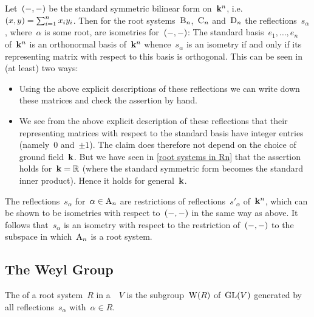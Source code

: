 \begin{remark}
  \label{standard root systems have isometric reflections}
  Let~$(-,-)$ be the standard symmetric bilinear form on~$\mathbf{k}^n$, i.e.~$(x,y) = \sum_{i=1}^n x_i y_i$.
  Then for the root systems~$\mathrm{B}_n$,~$\mathrm{C}_n$ and~$\mathrm{D}_n$ the reflections~$s_\alpha$, where~$\alpha$ is some root, are isometries for~$(-,-)$:
  The standard basis~$e_1, \dotsc, e_n$ of~$\mathbf{k}^n$ is an orthonormal basis of~$\mathbf{k}^n$ whence~$s_\alpha$ is an isometry if and only if its representing matrix with respect to this basis is orthogonal.
  This can be seen in (at least) two ways:
  \begin{itemize}
    \item
      Using the above explicit descriptions of these reflections we can write down these matrices and check the assertion by hand.
    \item
      We see from the above explicit description of these reflections that their representing matrices with respect to the standard basis have integer entries (namely~$0$ and~$\pm 1$).
      The claim does therefore not depend on the choice of ground field~$\kf$.
      But we have seen in \cref{root systems in Rn} that the assertion holds for~$\mathbf{k} = \mathbb{R}$ (where the standard symmetric form becomes the standard inner product).
      Hence it holds for general~$\kf$.
  \end{itemize}
  
  The reflections~$s_\alpha$ for~$\alpha \in \mathrm{A}_n$ are restrictions of reflections~$s'_\alpha$ of~$\mathbf{k}^n$, which can be shown to be isometries with respect to~$(-,-)$ in the same way as above.
  It follows that~$s_\alpha$ is an isometry with respect to the restriction of~$(-,-)$ to the subspace in which~$\mathrm{A}_n$ is a root system.
\end{remark}






\subsection{The Weyl Group}


\begin{definition}
  The  of a root system~$R$ in a~{\vectorspace{$\kf$}}~$V$ is the subgroup~$\operatorname{W}(R)$ of~$\operatorname{GL}(V)$ generated by all reflections~$s_\alpha$ with~$\alpha \in R$.
\end{definition}


